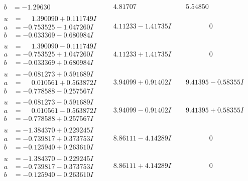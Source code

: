 \documentclass[1p]{elsarticle_modified}
\theoremstyle{definition}
\begin{document}
$$\begin{array}{c|c|c}
\begin{aligned}
b &= -1.29630\phantom{ +0.000000I}\end{aligned}
 & \phantom{-}4.81707\phantom{ +0.000000I} & \phantom{-}5.54850\phantom{ +0.000000I} \\ \hline\begin{aligned}
u &= \phantom{-}1.390090 + 0.111749 I \\
a &= -0.753525 - 1.047260 I \\
b &= -0.033369 - 0.680984 I\end{aligned}
 & \phantom{-}4.11233 - 1.41735 I & \phantom{-0.000000 } 0 \\ \hline\begin{aligned}
u &= \phantom{-}1.390090 - 0.111749 I \\
a &= -0.753525 + 1.047260 I \\
b &= -0.033369 + 0.680984 I\end{aligned}
 & \phantom{-}4.11233 + 1.41735 I & \phantom{-0.000000 } 0 \\ \hline\begin{aligned}
u &= -0.081273 + 0.591689 I \\
a &= \phantom{-}0.010561 + 0.563872 I \\
b &= -0.778588 - 0.257567 I\end{aligned}
 & \phantom{-}3.94099 + 0.91402 I & \phantom{-}9.41395 - 0.58355 I \\ \hline\begin{aligned}
u &= -0.081273 - 0.591689 I \\
a &= \phantom{-}0.010561 - 0.563872 I \\
b &= -0.778588 + 0.257567 I\end{aligned}
 & \phantom{-}3.94099 - 0.91402 I & \phantom{-}9.41395 + 0.58355 I \\ \hline\begin{aligned}
u &= -1.384370 + 0.229245 I \\
a &= -0.739817 + 0.373753 I \\
b &= -0.125940 + 0.263610 I\end{aligned}
 & \phantom{-}8.86111 - 4.14289 I & \phantom{-0.000000 } 0 \\ \hline\begin{aligned}
u &= -1.384370 - 0.229245 I \\
a &= -0.739817 - 0.373753 I \\
b &= -0.125940 - 0.263610 I\end{aligned}
 & \phantom{-}8.86111 + 4.14289 I & \phantom{-0.000000 } 0 \\ \hline\begin{aligned}

\end{aligned}
\end{array}$$
\end{document}
